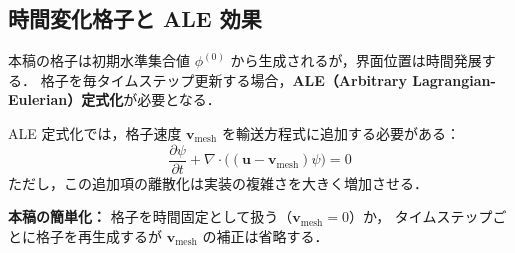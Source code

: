 \subsection{時間変化格子と ALE 効果}
\label{sec:grid_ale}

本稿の格子は初期水準集合値 $\phi^{(0)}$ から生成されるが，界面位置は時間発展する．
格子を毎タイムステップ更新する場合，\textbf{ALE（Arbitrary Lagrangian-Eulerian）定式化}が必要となる．

\begin{tcolorbox}[warnbox, title={本稿の実装方針：時間固定格子（簡単化のための仮定）}]
ALE 定式化では，格子速度 $\bm{v}_\text{mesh}$ を輸送方程式に追加する必要がある：
\[
  \frac{\partial\psi}{\partial t} + \nabla\cdot\bigl((\bm{u} - \bm{v}_\text{mesh})\psi\bigr) = 0
\]
ただし，この追加項の離散化は実装の複雑さを大きく増加させる．

\textbf{本稿の簡単化：} 格子を時間固定として扱う（$\bm{v}_\text{mesh} = 0$）か，
タイムステップごとに格子を再生成するが $\bm{v}_\text{mesh}$ の補正は省略する．
\end{tcolorbox}

